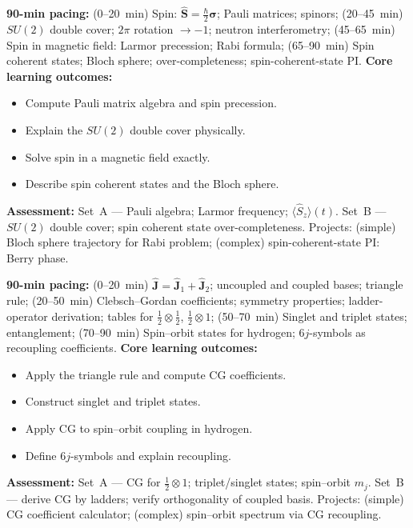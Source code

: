 \documentclass[11pt,a4paper]{article}
\begin{document}
\medskip

\begin{tcolorbox}[modulebox, title={Module~II.3 / L04: Spin Angular Momentum}]
\textbf{90-min pacing:} (0--20~min) Spin: $\hat{\mathbf{S}}=\tfrac{\hbar}{2}\hat{\boldsymbol{\sigma}}$; Pauli matrices; spinors; (20--45~min) $SU(2)$ double cover; $2\pi$ rotation $\to-1$; neutron interferometry; (45--65~min) Spin in magnetic field: Larmor precession; Rabi formula; (65--90~min) Spin coherent states; Bloch sphere; over-completeness; spin-coherent-state PI.
\medskip\textbf{Core learning outcomes:}
\begin{itemize}[leftmargin=1.4em,topsep=2pt,itemsep=1pt]
  \item Compute Pauli matrix algebra and spin precession.
  \item Explain the $SU(2)$ double cover physically.
  \item Solve spin in a magnetic field exactly.
  \item Describe spin coherent states and the Bloch sphere.
\end{itemize}
\medskip\textbf{Assessment:}
Set~A --- Pauli algebra; Larmor frequency; $\langle\hat{S}_z\rangle(t)$.
Set~B --- $SU(2)$ double cover; spin coherent state over-completeness.
Projects: (simple) Bloch sphere trajectory for Rabi problem; (complex) spin-coherent-state PI: Berry phase.
\end{tcolorbox}

\medskip

\begin{tcolorbox}[modulebox, title={Module~II.3 / L05: Addition of Angular Momenta}]
\textbf{90-min pacing:} (0--20~min) $\hat{\mathbf{J}}=\hat{\mathbf{J}}_1+\hat{\mathbf{J}}_2$; uncoupled and coupled bases; triangle rule; (20--50~min) Clebsch--Gordan coefficients; symmetry properties; ladder-operator derivation; tables for $\tfrac{1}{2}\otimes\tfrac{1}{2}$, $\tfrac{1}{2}\otimes1$; (50--70~min) Singlet and triplet states; entanglement; (70--90~min) Spin--orbit states for hydrogen; $6j$-symbols as recoupling coefficients.
\medskip\textbf{Core learning outcomes:}
\begin{itemize}[leftmargin=1.4em,topsep=2pt,itemsep=1pt]
  \item Apply the triangle rule and compute CG coefficients.
  \item Construct singlet and triplet states.
  \item Apply CG to spin--orbit coupling in hydrogen.
  \item Define $6j$-symbols and explain recoupling.
\end{itemize}
\medskip\textbf{Assessment:}
Set~A --- CG for $\tfrac{1}{2}\otimes1$; triplet/singlet states; spin--orbit $m_j$.
Set~B --- derive CG by ladders; verify orthogonality of coupled basis.
Projects: (simple) CG coefficient calculator; (complex) spin--orbit spectrum via CG recoupling.
\end{tcolorbox}
\end{document}
